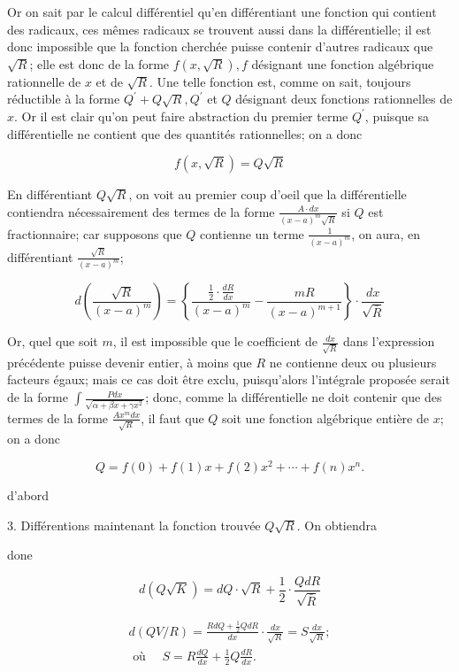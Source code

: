 \documentclass{article}
\begin{document}
Or on sait par le calcul différentiel qu'en différentiant une fonction qui contient des radicaux, ces mêmes radicaux se trouvent aussi dans la différentielle; il est donc impossible que la fonction cherchée puisse contenir d'autres radicaux que \(\sqrt{R}\); elle est donc de la forme \(f(x, \sqrt{R}), f\) désignant une fonction algébrique rationnelle de \(x\) et de \(\sqrt{R}\). Une telle fonction est, comme on sait, toujours réductible à la forme \(Q^{\prime}+Q \sqrt{R}, Q^{\prime}\) et \(Q\) désignant deux fonctions rationnelles de \(x\). Or il est clair qu'on peut faire abstraction du premier terme \(Q^{\prime}\), puisque sa différentielle ne contient que des quantités rationnelles; on a donc

\[
f(x, \sqrt{R})=Q \sqrt{R}
\]

En différentiant \(Q \sqrt{R}\), on voit au premier coup d'oeil que la différentielle contiendra nécessairement des termes de la forme \(\frac{A \cdot d x}{(x-a)^{m} \sqrt{R}}\) si \(Q\) est fractionnaire; car supposons que \(Q\) contienne un terme \(\frac{1}{(x-a)^{m}}\), on aura, en différentiant \(\frac{\sqrt{R}}{(x-a)^{m}}\);

\[
d\left(\frac{\sqrt{R}}{(x-a)^{m}}\right)=\left\{\frac{\frac{1}{2} \cdot \frac{d R}{d x}}{(x-a)^{m}}-\frac{m R}{(x-a)^{m+1}}\right\} \cdot \frac{d x}{\sqrt{\bar{R}}}
\]

Or, quel que soit \(m\), il est impossible que le coefficient de \(\frac{d x}{\sqrt{R}}\) dans l'expression précédente puisse devenir entier, à moins que \(R\) ne contienne deux ou plusieurs facteurs égaux; mais ce cas doit être exclu, puisqu'alors l'intégrale proposée serait de la forme \(\int \frac{P d x}{\sqrt{\alpha+\beta x+\gamma x^{2}}}\); donc, comme la différentielle ne
doit contenir que des termes de la forme \(\frac{A x^{m} d x}{\sqrt{R}}\), il faut que \(Q\) soit une fonction algébrique entière de \(x\); on a donc

\[
Q=f(0)+f(1) x+f(2) x^{2}+\cdots+f(n) x^{n} .
\]

d'abord

3. Différentions maintenant la fonction trouvée \(Q \sqrt{R}\). On obtiendra

done

\[
d(Q \sqrt{K})=d Q \cdot \sqrt{R}+\frac{1}{2} \cdot \frac{Q d R}{\sqrt{\bar{R}}}
\]

\[
\begin{gathered}
d(Q V / R)=\frac{R d Q+\frac{1}{2} Q d R}{d x} \cdot \frac{d x}{\sqrt{R}}=S \frac{d x}{\sqrt{R}} ; \\
\text { où } \quad S=R \frac{d Q}{d x}+\frac{1}{2} Q \frac{d R}{d x} .
\end{gathered}
\]
\end{document}
